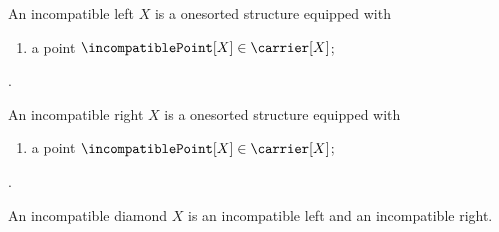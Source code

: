 \begin{struct}\label{incompatible_left}
    An incompatible left $X$ is a onesorted structure equipped with
    \begin{enumerate}
        \item\label{incompatible_left_point}
            a point $\incompatiblePoint[X]\in\carrier[X]$;
    \end{enumerate}
    .
\end{struct}

\begin{struct}\label{incompatible_right}
    An incompatible right $X$ is a onesorted structure equipped with
    \begin{enumerate}
        \item\label{incompatible_right_point}
            a point $\incompatiblePoint[X]\in\carrier[X]$;
    \end{enumerate}
    .
\end{struct}

\begin{struct}\label{incompatible_diamond}
    An incompatible diamond $X$ is an incompatible left and an incompatible
    right.
\end{struct}

